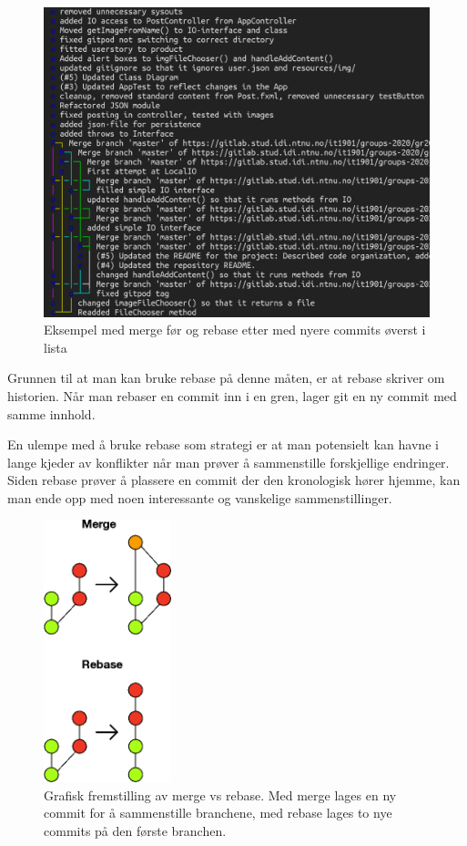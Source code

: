 \documentclass[12pt,a4paper]{article}
\begin{document}
\begin{figure}[ht]
    \includegraphics[width=\textwidth]{merge-rebase-example.png}
    \caption{Eksempel med merge før og rebase etter med nyere commits øverst i lista}
\end{figure}

Grunnen til at man kan bruke rebase på denne måten,
er at rebase skriver om historien. 
Når man rebaser en commit inn i en gren, lager git en ny commit med samme innhold.
\cite{gitEssentials}

En ulempe med å bruke rebase som strategi er at man potensielt kan havne
i lange kjeder av konflikter når man prøver å sammenstille forskjellige
endringer. Siden rebase prøver å plassere en commit der den kronologisk
hører hjemme, kan man ende opp med noen interessante og vanskelige
sammenstillinger.

\begin{figure}[ht]
    \centering
    \includegraphics[width=0.33\textwidth]{git.png}
    \caption{Grafisk fremstilling av merge vs rebase. Med merge lages en ny commit for å sammenstille branchene, med rebase lages to nye commits på den første branchen.}
\end{figure}
\end{document}
